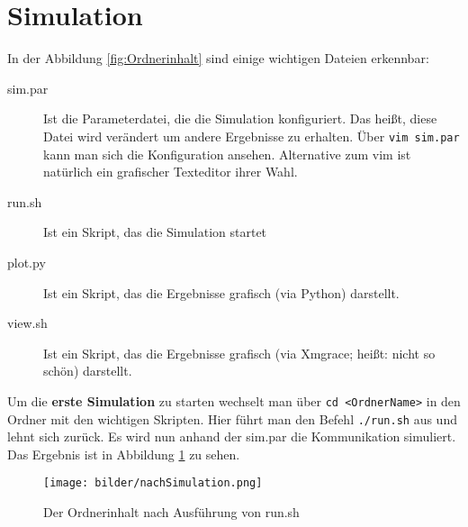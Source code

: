 \documentclass[11pt,div=14]{scrartcl}
\begin{document}
\section{Simulation}
\label{Simulation}
In der Abbildung \ref{fig:Ordnerinhalt} sind einige wichtigen Dateien erkennbar:
\begin{description}
\item[sim.par] Ist die Parameterdatei, die die Simulation konfiguriert. Das heißt, diese Datei wird verändert um andere Ergebnisse zu erhalten. Über \colorbox{lightred}{\lstinline$vim sim.par$} kann man sich die Konfiguration ansehen. Alternative zum vim ist natürlich ein grafischer Texteditor ihrer Wahl.
\item[run.sh] Ist ein Skript, das die Simulation startet
\item[plot.py] Ist ein Skript, das die Ergebnisse grafisch (via Python) darstellt.
\item[view.sh] Ist ein Skript, das die Ergebnisse grafisch (via Xmgrace; heißt: nicht so schön) darstellt.
\end{description}

Um die \textbf{erste Simulation} zu starten wechselt man über 
\colorbox{lightred}{\lstinline$cd <OrdnerName>$} in den Ordner mit den wichtigen Skripten. Hier führt man den Befehl \colorbox{lightred}{\lstinline$./run.sh$} aus und lehnt sich zurück. Es wird nun anhand der sim.par die Kommunikation simuliert. Das Ergebnis ist in Abbildung \ref{fig:OrdnerinhaltNachrunsh} zu sehen.

\begin{figure}[h!]
\centering
\texttt{[image: bilder/nachSimulation.png]}%
\caption{Der Ordnerinhalt nach Ausführung von run.sh}%
\label{fig:OrdnerinhaltNachrunsh}%
\end{figure}
\end{document}
